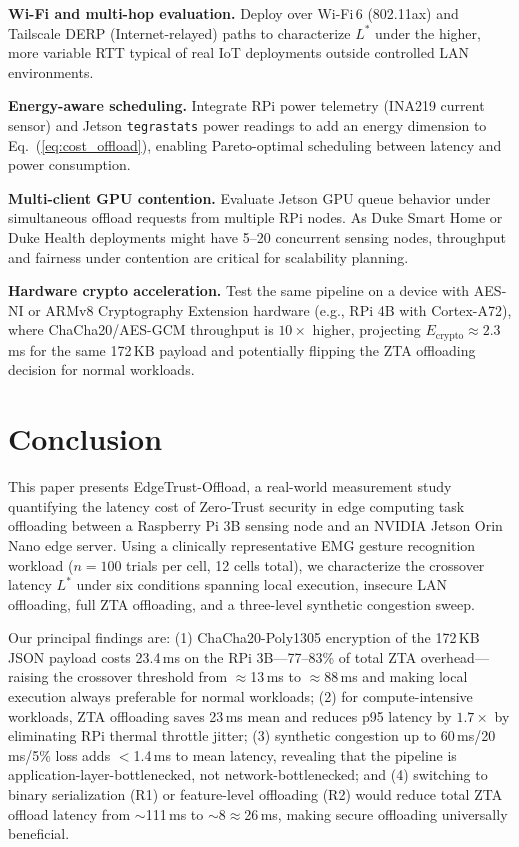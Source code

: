 \documentclass[10pt,twocolumn]{article}
\begin{document}
\textbf{Wi-Fi and multi-hop evaluation.}
Deploy over Wi-Fi\,6 (802.11ax) and Tailscale DERP (Internet-relayed)
paths to characterize $L^*$ under the higher, more variable RTT typical
of real IoT deployments outside controlled LAN environments.

\textbf{Energy-aware scheduling.}
Integrate RPi power telemetry (INA219 current sensor) and Jetson
\texttt{tegrastats} power readings to add an energy dimension to
Eq.~(\ref{eq:cost_offload}), enabling Pareto-optimal scheduling between
latency and power consumption.

\textbf{Multi-client GPU contention.}
Evaluate Jetson GPU queue behavior under simultaneous offload requests from
multiple RPi nodes.  As Duke Smart Home or Duke Health deployments might have
5--20 concurrent sensing nodes, throughput and fairness under contention are
critical for scalability planning.

\textbf{Hardware crypto acceleration.}
Test the same pipeline on a device with AES-NI or ARMv8 Cryptography
Extension hardware (e.g., RPi 4B with Cortex-A72), where ChaCha20/AES-GCM
throughput is $10\times$ higher, projecting $E_{\text{crypto}} \approx 2.3$\,ms
for the same 172\,KB payload and potentially flipping the ZTA offloading
decision for normal workloads.

\section{Conclusion}

This paper presents EdgeTrust-Offload, a real-world measurement study
quantifying the latency cost of Zero-Trust security in edge computing task
offloading between a Raspberry Pi 3B sensing node and an NVIDIA Jetson Orin
Nano edge server.  Using a clinically representative EMG gesture recognition
workload ($n=100$ trials per cell, 12 cells total), we characterize the
crossover latency $L^*$ under six conditions spanning local execution,
insecure LAN offloading, full ZTA offloading, and a three-level synthetic
congestion sweep.

Our principal findings are: (1) ChaCha20-Poly1305 encryption of the
172\,KB JSON payload costs 23.4\,ms on the RPi 3B—77--83\% of total ZTA
overhead—raising the crossover threshold from $\approx$13\,ms to
$\approx$88\,ms and making local execution always preferable for normal
workloads; (2) for compute-intensive workloads, ZTA offloading saves 23\,ms
mean and reduces p95 latency by $1.7\times$ by eliminating RPi thermal
throttle jitter; (3) synthetic congestion up to 60\,ms/20\,ms/5\% loss adds
$<$1.4\,ms to mean latency, revealing that the pipeline is
application-layer-bottlenecked, not network-bottlenecked; and (4) switching
to binary serialization (R1) or feature-level offloading (R2) would reduce
total ZTA offload latency from $\sim$111\,ms to $\sim$8$\approx$26\,ms,
making secure offloading universally beneficial.
\end{document}
